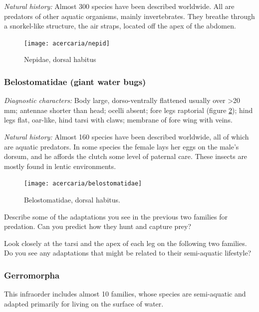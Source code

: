 \noindent{}\textit{Natural history:} Almost 300 species have been described worldwide. All are predators of other aquatic organisms, mainly invertebrates. They breathe through a snorkel-like structure, the air straps, located off the apex of the abdomen.\vspace{3mm}

\begin{figure}[ht!]
 \centering
 \texttt{[image: acercaria/nepid]}
 \caption{Nepidae, dorsal habitus \citep[Modified from Fig. 7:19 in][]{bhlitem126080aquatic}}
 \label{fig:nepid1}
\end{figure}

\subsubsection{Belostomatidae (giant water bugs)}
\noindent{}\textit{Diagnostic characters:} Body large, dorso-ventrally flattened usually over \textgreater20 mm; antennae shorter than head; ocelli absent; fore legs raptorial (figure \ref{fig:belostom1}); hind legs flat, oar-like, hind tarsi with claws; membrane of fore wing with veins.\vspace{3mm}

\noindent{}\textit{Natural history:} Almost 160 species have been described worldwide, all of which are aquatic predators. In some species the female lays her eggs on the male's dorsum, and he affords the clutch some level of paternal care. These insects are mostly found in lentic environments.\vspace{3mm}

\begin{figure}[ht!]
 \centering
 \texttt{[image: acercaria/belostomatidae]}
 \caption{Belostomatidae, dorsal habitus. \citep[Modified from Fig.7:17 in ][]{bhlitem126080aquatic}}
 \label{fig:belostom1}
\end{figure}

\begin{theo}
{}Describe some of the adaptations you see in the previous two families for predation. Can you predict how they hunt and capture prey?\vspace{3mm}

\noindent{}Look closely at the tarsi and the apex of each leg on the following two families. Do you see any adaptations that might be related to their semi-aquatic lifestyle?
\end{theo}

\subsubsection{Gerromorpha}
This infraorder includes almost 10 families, whose species are semi-aquatic and adapted primarily for living on the surface of water.

